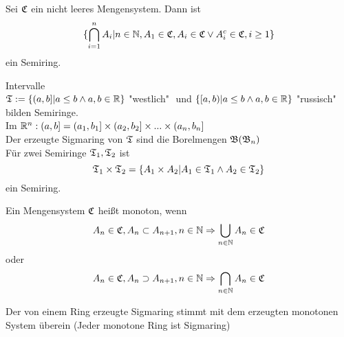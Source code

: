 		\begin{satz}
			Sei $\mathfrak{C}$ ein nicht leeres Mengensystem. Dann ist
			\[ \{ \bigcap_{i=1}^n A_i | n \in \mathbb{N} , A_1 \in \mathfrak{C}, A_i \in \mathfrak{C} \vee A_i^c \in \mathfrak{C} ,i \geq 1 \} \]
			ein Semiring.
		\end{satz}
		
		\begin{bsp}Intervalle\\
				$ \mathfrak{T}:=\{ (a,b] | a \leq b \wedge a,b \in \mathbb{R} \} $
				"westlich" $ $ und 
				$ \{ [a,b) | a \leq b \wedge a,b \in \mathbb{R} \} $ 
				"russisch"
			bilden Semiringe.\\
			Im $\mathbb{R}^n:(a,b]=(a_1,b_1] \times (a_2,b_2] \times ... \times (a_n,b_n]$\\
			Der erzeugte Sigmaring von $\mathfrak{T}$ sind die Borelmengen $ \mathfrak{B} (\mathfrak{B}_n)$\\
			Für zwei Semiringe $\mathfrak{T}_1, \mathfrak{T}_2$ ist 
			\[ \mathfrak{T}_1 \times \mathfrak{T}_2 = \{ A_1 \times A_2 | A_1 \in \mathfrak{T}_1 \wedge A_2 \in \mathfrak{T}_2 \} \]
			ein Semiring.			
		\end{bsp}
		
		\begin{defi}
			Ein Mengensystem $\mathfrak{C}$ heißt monoton, wenn
			\[ A_n \in \mathfrak{C}, A_n \subset A_{n+1} , n\in \mathbb{N} \Rightarrow \bigcup_{n \in \mathbb{N}} A_n \in \mathfrak{C} \]
			oder 
			\[ A_n \in \mathfrak{C}, A_n \supset A_{n+1} , n\in \mathbb{N} \Rightarrow \bigcap_{n \in \mathbb{N}} A_n \in \mathfrak{C} \]
		\end{defi}
		
		\begin{satz}
			Der von einem Ring erzeugte Sigmaring stimmt mit dem erzeugten monotonen System überein (Jeder monotone Ring ist Sigmaring)
		\end{satz}
		
